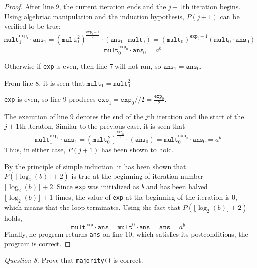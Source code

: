 \documentclass[11pt]{article}
\begin{document}
\begin{enumerate}[label=(\alph*)]
\begin{proof}
            After line 9, the current iteration ends and the \(j+1\)th iteration begins. Using algebriac manipulation and the induction hypothesis, \(P(j+1)\) can be verified to be true:
            \[
                \texttt{mult}_1^{\texttt{exp}_1} \cdot \texttt{ans}_1 = (\texttt{mult}_0^{\, 2})^\frac{\texttt{exp}_0 - 1}{2} \cdot (\texttt{ans}_0 \cdot \texttt{mult}_0) = (\texttt{mult}_0)^{\texttt{exp}_0 - 1}(\texttt{mult}_0 \cdot \texttt{ans}_0)
            \]
            \[
                = \texttt{mult}_0 ^{\texttt{exp}_0} \cdot \texttt{ans}_0 = a^b
            \]

            Otherwise if \verb|exp| is even, then line 7 will not run, so \(\texttt{ans}_1 = \texttt{ans}_0\).

            From line 8, it is seen that \(\texttt{mult}_1 = \texttt{mult}_0^2\)

            \verb|exp| is even, so line 9 produces \(\texttt{exp}_1 = \texttt{exp}_0 // 2 = \frac{\texttt{exp}_0}{2}\).

            The execution of line 9 denotes the end of the \(j\)th iteration and the start of the \(j+1\)th iteraton. Similar to the previous case, it is seen that 
            \[
                \texttt{mult}_1^{\texttt{exp}_1} \cdot \texttt{ans}_1 = (\texttt{mult}_0^{\, 2})^\frac{\texttt{exp}_0}{2} \cdot (\texttt{ans}_0) = \texttt{mult}_0^{\texttt{exp}_0} \cdot \texttt{ans}_0 = a^b
            \]
            Thus, in either case, \(P(j+1)\) has been shown to hold.

            By the principle of simple induction, it has been shown that \(P(\lfloor \log _2(b) \rfloor + 2)\) is true at the beginning of iteration number \(\lfloor \log _2(b) \rfloor + 2\). Since \verb|exp| was initialized as \(b\) and has been halved \(\lfloor \log _2(b) \rfloor + 1\) times, the value of \verb|exp| at the beginning of the iteration is 0, which means that the loop terminates. Using the fact that \(P(\lfloor \log _2(b) \rfloor + 2)\) holds,
            \[
                \texttt{mult}^\texttt{exp} \cdot \texttt{ans} = \texttt{mult}^0 \cdot \texttt{ans} = \texttt{ans} = a^b
            \]
            Finally, he program returns \verb|ans| on line 10, which satisfies its postconditions, the program is correct.

        \end{proof}
    \end{enumerate}
    \textit{Question 8.} Prove that \verb|majority()| is correct.
\end{document}
